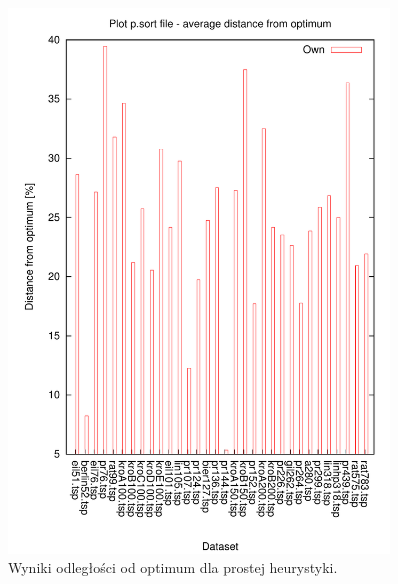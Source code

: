 \begin{figure}
\begin{center}
\includegraphics[width=0.9\textwidth]{wykresy/own_results}
\end{center}
\caption{Wyniki odległości od optimum dla prostej heurystyki.}
\label{own_results}
\end{figure}



